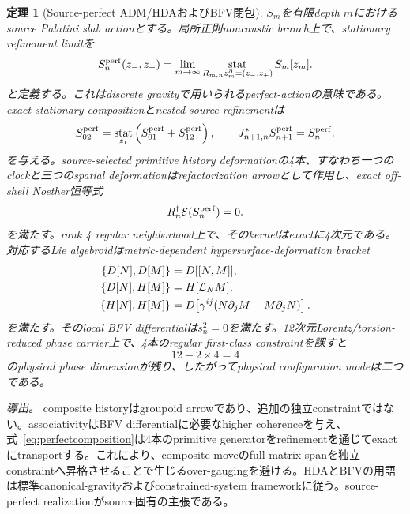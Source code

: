 \documentclass[11pt]{article}
\newtheorem{theorem}{定理}[section]
\theoremstyle{definition}
\theoremstyle{remark}
\newcommand{\cE}{\mathcal E}
\begin{document}
\begin{theorem}[Source-perfect ADM/HDAおよびBFV閉包]
$S_m$を有限depth $m$におけるsource Palatini slab actionとする。局所正則noncaustic branch上で、stationary refinement limitを
\begin{equation}
S_n^{\rm perf}(z_-,z_+)
=\lim_{m\to\infty}
\operatorname*{stat}_{R_{m,n}z_m^{\partial}=(z_-,z_+)}S_m[z_m].
\label{eq:perfectaction}
\end{equation}
と定義する。これはdiscrete gravityで用いられるperfect-actionの意味である\cite{bahrdittrich2009}。exact stationary compositionとnested source refinementは
\begin{equation}
S_{02}^{\rm perf}
=\operatorname*{stat}_{z_1}
\left(S_{01}^{\rm perf}+S_{12}^{\rm perf}\right),
\qquad
J_{n+1,n}^{*}S_{n+1}^{\rm perf}=S_n^{\rm perf}.
\label{eq:perfectcomposition}
\end{equation}
を与える。source-selected primitive history deformationの4本、すなわち一つのclockと三つのspatial deformationはrefactorization arrowとして作用し、exact off-shell Noether恒等式
\begin{equation}
R_n^\dagger\cE(S_n^{\rm perf})=0.
\label{eq:perfectnoether}
\end{equation}
を満たす。rank 4 regular neighborhood上で、そのkernelはexactに4次元である。対応するLie algebroidはmetric-dependent hypersurface-deformation bracket
\begin{align}
\{D[N],D[M]\}&=D[[N,M]],\notag\\
\{D[N],H[M]\}&=H[\mathcal L_NM],\notag\\
\{H[N],H[M]\}
&=D\!\left[\gamma^{ij}(N\partial_jM-M\partial_jN)\right].
\label{eq:hda}
\end{align}
を満たす。そのlocal BFV differentialは$s_n^2=0$を満たす。12次元Lorentz/torsion-reduced phase carrier上で、4本のregular first-class constraintを課すと
\begin{equation}
12-2\times4=4
\end{equation}
のphysical phase dimensionが残り、したがってphysical configuration modeは二つである。
\end{theorem}

\textit{導出。} composite historyはgroupoid arrowであり、追加の独立constraintではない。associativityはBFV differentialに必要なhigher coherenceを与え、式~\eqref{eq:perfectcomposition}は4本のprimitive generatorをrefinementを通じてexactにtransportする。これにより、composite moveのfull matrix spanを独立constraintへ昇格させることで生じるover-gaugingを避ける。HDAとBFVの用語は標準canonical-gravityおよびconstrained-system frameworkに従う\cite{hkt1976,henneauxteitelboim1992}。source-perfect realizationがsource固有の主張である。
\end{document}
